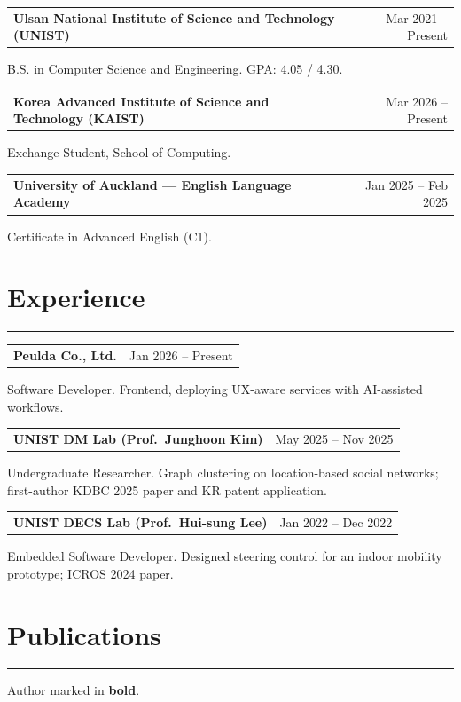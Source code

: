 \documentclass[11pt,letterpaper]{article}
\makeatletter
\newcommand{\cvrow}[2]{%
  \noindent\begin{tabularx}{\linewidth}{@{}X r@{}}\textbf{#1} & {#2}\end{tabularx}\par
}
\newcommand{\cvsub}[1]{\noindent #1\par}
\makeatother
\begin{document}
\cvrow{Ulsan National Institute of Science and Technology (UNIST)}{Mar 2021 -- Present}
\cvsub{B.S. in Computer Science and Engineering. GPA: 4.05 / 4.30.}
\vspace{4pt}

\cvrow{Korea Advanced Institute of Science and Technology (KAIST)}{Mar 2026 -- Present}
\cvsub{Exchange Student, School of Computing.}
\vspace{4pt}

\cvrow{University of Auckland --- English Language Academy}{Jan 2025 -- Feb 2025}
\cvsub{Certificate in Advanced English (C1).}

\vspace{4pt}
\section*{Experience}
\vspace{-4pt}
\rule{\textwidth}{0.5pt}\vspace{2pt}

\cvrow{Peulda Co., Ltd.}{Jan 2026 -- Present}
\cvsub{Software Developer. Frontend, deploying UX-aware services with AI-assisted workflows.}
\vspace{4pt}

\cvrow{UNIST DM Lab (Prof.\ Junghoon Kim)}{May 2025 -- Nov 2025}
\cvsub{Undergraduate Researcher. Graph clustering on location-based social networks; first-author KDBC 2025 paper and KR patent application.}
\vspace{4pt}

\cvrow{UNIST DECS Lab (Prof.\ Hui-sung Lee)}{Jan 2022 -- Dec 2022}
\cvsub{Embedded Software Developer. Designed steering control for an indoor mobility prototype; ICROS 2024 paper.}

\vspace{4pt}
\section*{Publications}
\vspace{-4pt}
\rule{\textwidth}{0.5pt}\vspace{2pt}

\noindent Author marked in \textbf{bold}.\par\vspace{4pt}
\end{document}
